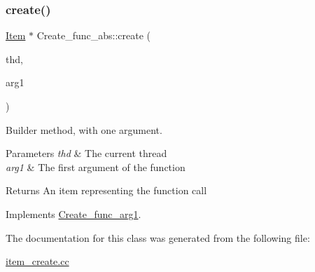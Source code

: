\subsubsection{\texorpdfstring{create()}{create()}}
{\footnotesize\ttfamily \mbox{\hyperlink{classItem}{Item}} $\ast$ Create\+\_\+func\+\_\+abs\+::create (\begin{DoxyParamCaption}\item[{T\+HD $\ast$}]{thd,  }\item[{\mbox{\hyperlink{classItem}{Item}} $\ast$}]{arg1 }\end{DoxyParamCaption})\hspace{0.3cm}{\ttfamily [virtual]}}

Builder method, with one argument. 
\begin{DoxyParams}{Parameters}
{\em thd} & The current thread \\
\hline
{\em arg1} & The first argument of the function \\
\hline
\end{DoxyParams}
\begin{DoxyReturn}{Returns}
An item representing the function call 
\end{DoxyReturn}


Implements \mbox{\hyperlink{classCreate__func__arg1_a3e9a98f755cd82c3e762e334c955a8c9}{Create\+\_\+func\+\_\+arg1}}.



The documentation for this class was generated from the following file\+:\begin{DoxyCompactItemize}
\item 
\mbox{\hyperlink{item__create_8cc}{item\+\_\+create.\+cc}}\end{DoxyCompactItemize}
